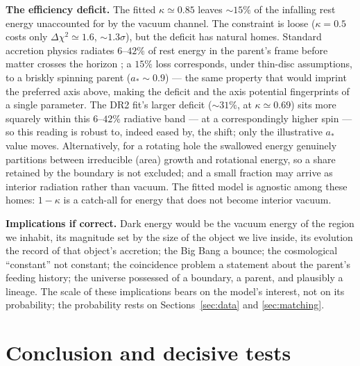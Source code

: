 \documentclass[11pt,a4paper]{article}
\begin{document}
\textbf{The efficiency deficit.} The fitted $\kappa\simeq0.85$ leaves $\sim15\%$ of the infalling rest energy unaccounted for by the vacuum channel. The constraint is loose ($\kappa=0.5$ costs only $\Delta\chi^2\simeq1.6$, $\sim1.3\sigma$), but the deficit has natural homes. Standard accretion physics radiates $6$--$42\%$ of rest energy in the parent's frame before matter crosses the horizon \citep{BardeenPressTeukolsky1972,NovikovThorne1973,ShakuraSunyaev1973}; a $15\%$ loss corresponds, under thin-disc assumptions, to a briskly spinning parent ($a_*\sim0.9$) \citep{Thorne1974} --- the same property that would imprint the preferred axis above, making the deficit and the axis potential fingerprints of a single parameter. The DR2 fit's larger deficit ($\sim31\%$, at $\kappa\simeq0.69$) sits more squarely within this $6$--$42\%$ radiative band --- at a correspondingly higher spin --- so this reading is robust to, indeed eased by, the shift; only the illustrative $a_*$ value moves. Alternatively, for a rotating hole the swallowed energy genuinely partitions between irreducible (area) growth and rotational energy, so a share retained by the boundary is not excluded; and a small fraction may arrive as interior radiation rather than vacuum. The fitted model is agnostic among these homes: $1-\kappa$ is a catch-all for energy that does not become interior vacuum.

\textbf{Implications if correct.} Dark energy would be the vacuum energy of the region we inhabit, its magnitude set by the size of the object we live inside, its evolution the record of that object's accretion; the Big Bang a bounce; the cosmological ``constant'' not constant; the coincidence problem a statement about the parent's feeding history; the universe possessed of a boundary, a parent, and plausibly a lineage. The scale of these implications bears on the model's interest, not on its probability; the probability rests on Sections~\ref{sec:data} and \ref{sec:matching}.

\section{Conclusion and decisive tests}\label{sec:conclusion}
\end{document}

